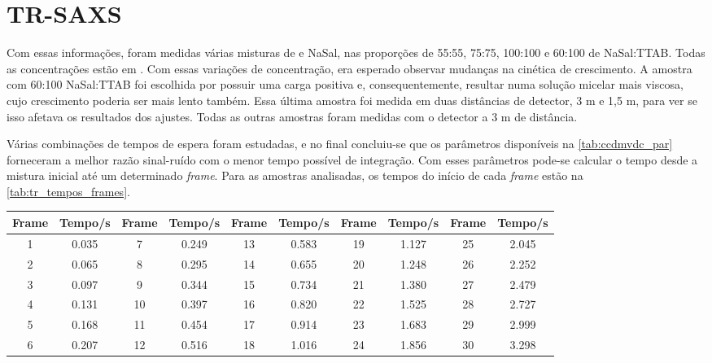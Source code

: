 	\section{TR-SAXS} 
	\label{sec:tr-saxs}
	Com essas informações, foram medidas várias misturas de \TTAB{} e NaSal, nas proporções de 55:55, 75:75, 100:100 e 60:100 de NaSal:TTAB. Todas as concentrações estão em \mM. Com essas variações de concentração, era esperado observar mudanças na cinética de crescimento. A amostra com 60:100 NaSal:TTAB foi escolhida por possuir uma carga positiva e, consequentemente, resultar numa solução micelar mais viscosa, cujo crescimento poderia ser mais lento também. Essa última amostra foi medida em duas distâncias de detector, 3 m e 1,5 m, para ver se isso afetava os resultados dos ajustes. Todas as outras amostras foram medidas com o detector a 3 m de distância.
	
	Várias combinações de tempos de espera foram estudadas, e no final concluiu-se que os parâmetros disponíveis na \autoref{tab:ccdmvdc_par} forneceram a melhor razão sinal-ruído com o menor tempo possível de integração. Com esses parâmetros pode-se calcular o tempo desde a mistura inicial até um determinado \emph{frame}. Para as amostras analisadas, os tempos do início de cada \emph{frame} estão na \autoref{tab:tr_tempos_frames}.
	
				\begin{table}[h]
		{%
			\begin{tabular}{c c | c c | c c | c c | c c}
				\toprule
				Frame & Tempo/s & Frame & Tempo/s & Frame & Tempo/s & Frame & Tempo/s & Frame & Tempo/s \\ \midrule
				  1   & 0.035   & 7     & 0.249   & 13    & 0.583   & 19    & 1.127   & 25    & 2.045   \\
				  2   & 0.065   & 8     & 0.295   & 14    & 0.655   & 20    & 1.248   & 26    & 2.252   \\
				  3   & 0.097   & 9     & 0.344   & 15    & 0.734   & 21    & 1.380   & 27    & 2.479   \\
				  4   & 0.131   & 10    & 0.397   & 16    & 0.820   & 22    & 1.525   & 28    & 2.727   \\
				  5   & 0.168   & 11    & 0.454   & 17    & 0.914   & 23    & 1.683   & 29    & 2.999   \\
				  6   & 0.207   & 12    & 0.516   & 18    & 1.016   & 24    & 1.856   & 30    & 3.298	\\ \bottomrule
			\end{tabular}
		}{}
	\end{table}  
	

